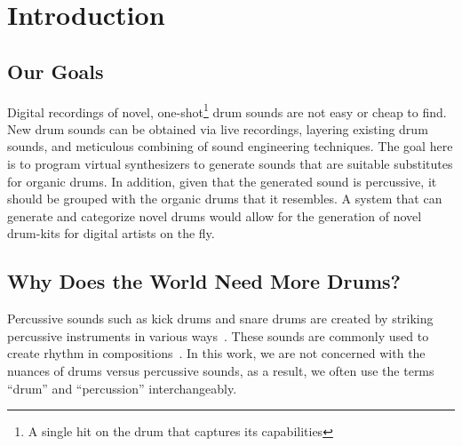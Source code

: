 \documentclass[\main/thesis.tex]{subfiles}
\begin{document}
\chapter{Introduction}


\section{Our Goals}
Digital recordings of novel, one-shot\footnote{A single hit on the drum that captures its capabilities} drum sounds are not easy or cheap to find. New drum sounds can be obtained via live recordings, layering existing drum sounds, and meticulous combining of sound engineering techniques. The goal here is to program virtual synthesizers to generate sounds that are suitable substitutes for organic drums. In addition, given that the generated sound is percussive, it should be grouped with the organic drums that it resembles. A system that can generate and categorize novel drums would allow for the generation of novel drum-kits for digital artists on the fly. 


\section{Why Does the World Need More Drums?}
Percussive sounds such as kick drums and snare drums are created by striking percussive instruments in various ways~\cite{barry2005drum}. These sounds are commonly used to create rhythm in compositions~\cite{needham1967percussion}. In this work, we are not concerned with the nuances of drums versus percussive sounds, as a result, we often use the terms \enquote{drum} and \enquote{percussion} interchangeably.
\end{document}
